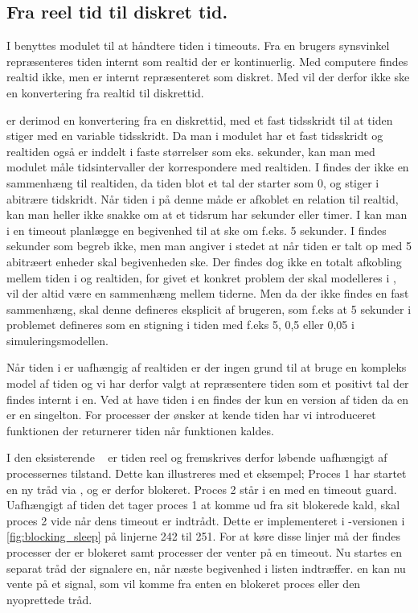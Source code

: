 \subsection{Fra reel tid til diskret tid.}\label{sec:discrete}
 I \pycsp benyttes modulet 
 til at håndtere tiden i timeouts. Fra en brugers synsvinkel
repræsenteres tiden internt som realtid der er kontinuerlig. Med computere findes realtid ikke, men  er internt repræsenteret
som diskret. Med  \des vil der derfor ikke ske en konvertering fra realtid til  diskrettid. 

\Des er derimod en konvertering fra en diskrettid, med et fast tidsskridt til at tiden stiger med en variable tidsskridt. 
Da man i  modulet har et fast tidsskridt og
realtiden også er inddelt i faste størrelser
som eks. sekunder, kan man med  modulet måle tidsintervaller der
korrespondere med realtiden. I \des findes der ikke en
sammenhæng til  realtiden, da tiden blot et tal der starter som 0, og stiger
i abitrære tidskridt. Når tiden i \des på denne måde er afkoblet
en relation til realtid, kan man heller ikke snakke om at et tidsrum
har sekunder eller timer. I \pycsp kan man i en timeout planlægge en
begivenhed til at ske om f.eks. 5 sekunder. I \des findes sekunder som
begreb ikke, men man  angiver i stedet at når tiden er talt op med 5 abitræert enheder skal
begivenheden ske. Der findes dog ikke en totalt afkobling mellem tiden i \des og realtiden, for givet et konkret problem der skal modelleres i \des, vil der altid være en sammenhæng mellem tiderne. Men da der ikke findes en fast sammenhæng, skal denne defineres eksplicit af brugeren, som f.eks at 5 sekunder i problemet defineres som en stigning i tiden med f.eks 5, 0,5 eller 0,05 i simuleringsmodellen.

Når tiden i \des er uafhængig af realtiden er der ingen grund til at bruge en kompleks model af tiden og vi har derfor valgt at repræsentere tiden som et positivt tal der findes internt i \sched en. Ved at have tiden i  \sched en findes der kun en version af tiden da  \sched en er en singelton. For processer der ønsker at kende tiden har vi
introduceret funktionen  der returnerer tiden når funktionen kaldes. 

I den eksisterende \sched ~ er tiden reel og fremskrives derfor løbende uafhængigt af processernes tilstand. Dette kan illustreres med et eksempel; Proces 1 har startet en ny tråd via , og er derfor blokeret. Proces 2 står i en  med en timeout guard. Uafhængigt af tiden det tager proces 1 at komme ud fra sit blokerede kald, skal proces 2 vide når dens timeout er indtrådt. Dette er implementeret i -versionen i \cref{fig:blocking_sleep} på linjerne 242 til 251. For at køre disse linjer må  der findes processer der er blokeret samt processer der venter på en timeout. Nu startes en separat tråd der signalere \sched en, når næste begivenhed i  listen indtræffer. \Sched en kan nu vente på et signal, som vil komme fra enten en blokeret proces eller den nyoprettede tråd.

